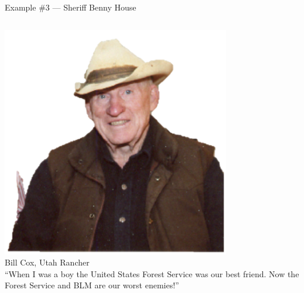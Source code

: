 \begin{frame}{Example \#3 --- Sheriff Benny House}
    \begin{columns}[onlytextwidth]
            \centering
            \includegraphics[width=0.75\textwidth]{img/bill-cox.png} \\
            Bill Cox, Utah Rancher \\

            ``When I was a boy the United States Forest Service was our best friend. Now the Forest Service and BLM are our worst enemies!''
    \end{columns}
\end{frame}

